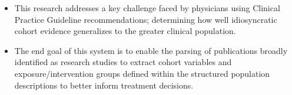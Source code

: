 \documentclass[10pt]{article}
\newcommand{\tabularxwidth}{\textwidth}
\begin{document}
\begin{minipage}{\tabularxwidth}
        \begin{itemize}[noitemsep, topsep=3pt, parsep=0pt, partopsep=0pt]
            
                \item 
    This research addresses a key challenge faced by physicians using Clinical Practice Guideline recommendations; determining how well idiosyncratic cohort evidence generalizes to the greater clinical population.
            
                \item 
    The end goal of this system is to enable the parsing of publications broadly identified as research studies to extract cohort variables and exposure/intervention groups defined within the structured population descriptions to better inform treatment decisions.
            
        \end{itemize}

        
            \vspace{.5em}
        

        \end{minipage}
    
\end{document}

